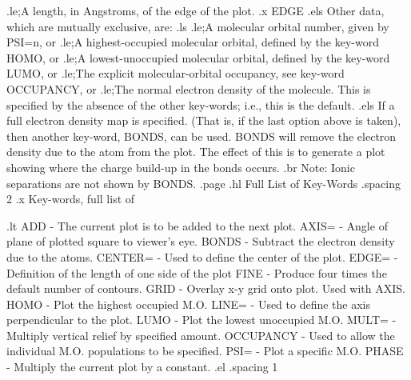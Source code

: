 .le;A length, in Angstroms, of the edge of the plot.
.x EDGE
.els
 Other data, which are mutually exclusive, are:
.ls
.le;A molecular orbital number, given by PSI=n, or
.le;A highest-occupied molecular orbital, defined by the key-word HOMO, or
.le;A lowest-unoccupied molecular orbital, defined by the key-word LUMO, or
.le;The explicit molecular-orbital occupancy, see key-word OCCUPANCY, or
.le;The normal electron density of the molecule. This is specified by
the absence of the other key-words; i.e., this is the default.
.els
 If a full electron density map is specified. (That is, if the last option 
above is taken), then another key-word, BONDS, can be used. BONDS will remove the
electron density due to the atom from the plot. The effect of this is to 
generate a plot showing where the charge build-up in the bonds occurs.
.br
Note: Ionic separations are not shown by BONDS.
.page
.hl Full List of Key-Words
.spacing 2
.x Key-words, full list of

.lt
 ADD         -  The current plot is to be added to the next plot.
 AXIS=       -  Angle of plane of plotted square to viewer's eye.
 BONDS       -  Subtract the electron density due to the atoms.
 CENTER=     -  Used to define the center of the plot.
 EDGE=       -  Definition of the length of one side of the plot
 FINE        -  Produce four times the default number of contours.
 GRID        -  Overlay x-y grid onto plot. Used with AXIS.
 HOMO        -  Plot the highest occupied M.O.
 LINE=       -  Used to define the axis perpendicular to the plot.
 LUMO        -  Plot the lowest unoccupied M.O. 
 MULT=       -  Multiply vertical relief by specified amount.
 OCCUPANCY   -  Used to allow the individual M.O. populations to be specified.
 PSI=        -  Plot a specific M.O. 
 PHASE       -  Multiply the current plot by a constant.
.el
.spacing 1

